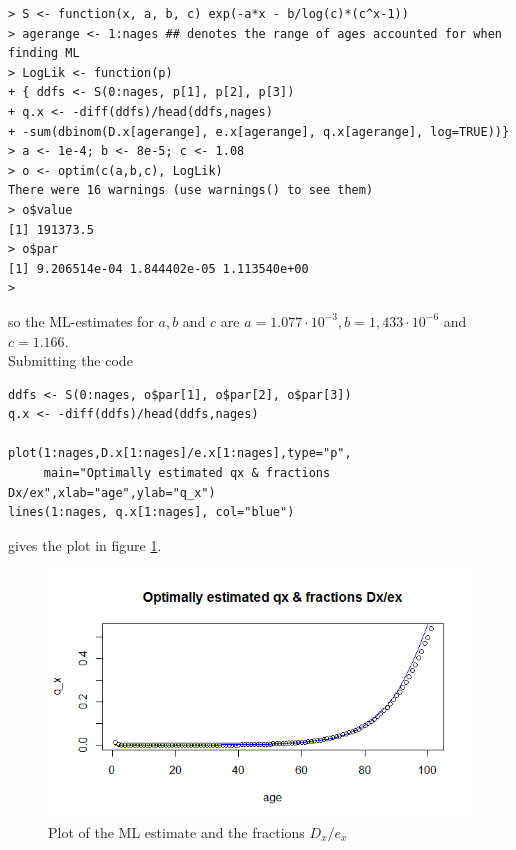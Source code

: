 \begin{verbatim}
> S <- function(x, a, b, c) exp(-a*x - b/log(c)*(c^x-1))
> agerange <- 1:nages ## denotes the range of ages accounted for when finding ML
> LogLik <- function(p)
+ { ddfs <- S(0:nages, p[1], p[2], p[3])
+ q.x <- -diff(ddfs)/head(ddfs,nages)
+ -sum(dbinom(D.x[agerange], e.x[agerange], q.x[agerange], log=TRUE))}
> a <- 1e-4; b <- 8e-5; c <- 1.08
> o <- optim(c(a,b,c), LogLik) 
There were 16 warnings (use warnings() to see them)
> o$value
[1] 191373.5
> o$par
[1] 9.206514e-04 1.844402e-05 1.113540e+00
>
\end{verbatim}
so the ML-estimates for $a, b$ and $c$ are $a = 1.077 \cdot 10^{-3}, b=1,433 \cdot 10^{-6}$ and $c = 1.166$. \\
Submitting the code
\begin{verbatim}
ddfs <- S(0:nages, o$par[1], o$par[2], o$par[3])
q.x <- -diff(ddfs)/head(ddfs,nages)

plot(1:nages,D.x[1:nages]/e.x[1:nages],type="p",
     main="Optimally estimated qx & fractions Dx/ex",xlab="age",ylab="q_x")
lines(1:nages, q.x[1:nages], col="blue")
\end{verbatim}
gives the plot in figure \ref{Figure_Question9_1}.
\begin{center}
\begin{figure}[H]

\includegraphics[scale=1]{Question_9_MakehamGompertz_1.png}

\caption{Plot of the ML estimate and the fractions $D_x/e_x$}
\label{Figure_Question9_1}

\end{figure}
\end{center}

